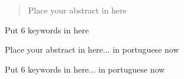\begin{abstract}
Place your abstract in here
\end{abstract}
\begin{keywords}
Put 6 keywords in here
\end{keywords}
\clearpage
\thispagestyle{empty}
\cleardoublepage

\begin{resumo}
Place your abstract in here... in portuguese now
\end{resumo}

\begin{palavraschave}
Put 6 keywords in here... in portuguese now
\end{palavraschave}

\clearpage
\thispagestyle{empty}
\cleardoublepage

\dominitoc
\dominilof
\dominilot
 
